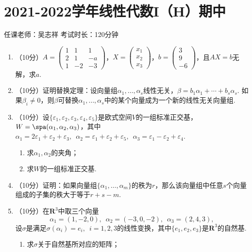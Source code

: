 \section{2021-2022学年线性代数I（H）期中}

\begin{center}
    任课老师：吴志祥\hspace{4em} 考试时长：120分钟
\end{center}
\begin{enumerate}
    \item （10分）$A=\begin{pmatrix}
        1 & 1 & 1 \\ 2 & 1 & -a \\ 1 & -2 & -3
    \end{pmatrix}$，$X=\begin{pmatrix}
        x_1 \\ x_2 \\ x_3
    \end{pmatrix}$，$b=\begin{pmatrix}
        3 \\ 9 \\ -6
    \end{pmatrix}$，且$AX=b$无解，求$a$.

    \item （10分）证明替换定理：设向量组$\alpha_1,\ldots,\alpha_s$线性无关，$\beta=b_1\alpha_1+\cdots+b_s\alpha_s$. 如果$\beta_i\neq 0$，则$\beta$可替换$\alpha_1,\ldots,\alpha_s$中的某个向量成为一个新的线性无关向量组.

    \item （10分）设$\{\varepsilon_1,\varepsilon_2,\varepsilon_3,\varepsilon_4,\varepsilon_5\}$是欧式空间$V$的一组标准正交基，$W=\spa(\alpha_1,\alpha_2,\alpha_3)$，其中$\alpha_1=2\varepsilon_1+\varepsilon_2+\varepsilon_3,\enspace \alpha_2=\varepsilon_1+\varepsilon_2+\varepsilon_5,\enspace \alpha_3=\varepsilon_1-\varepsilon_2+\varepsilon_4$.
    \begin{enumerate}
        \item 求$\alpha_1,\alpha_2$的夹角；

        \item 求$W$的一组标准正交基.
    \end{enumerate}

    \item （10分）证明：如果向量组$\{\alpha_1,\ldots,\alpha_m\}$的秩为$r$，那么该向量组中任意$s$个向量组成的子集的秩大于等于$r+s-m$.

    \item （10分）在$\mathbf{R}^3$中取三个向量
    \[\alpha_1=(1,-2,0),\enspace \alpha_2=(-3,0,-2),\enspace \alpha_3=(2,4,3),\]
    设$\sigma$是满足$\sigma(\alpha_i)=e_i,\enspace i=1,2,3$的线性变换，其中$\{e_1,e_2,e_3\}$是$\mathbf{R}^3$的自然基.
    \begin{enumerate}
        \item 求$\sigma$关于自然基所对应的矩阵；


\end{enumerate}
\end{enumerate}
